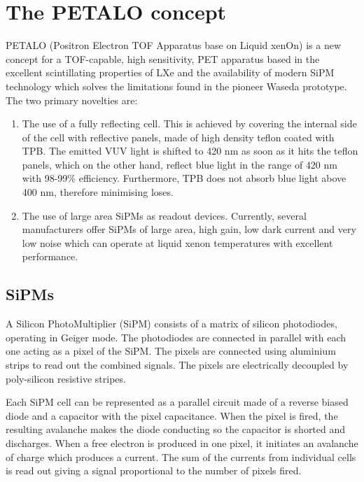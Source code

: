 \documentclass[a4paper,11pt,oneside]{article}
\begin{document}
\section{The PETALO concept}
\label{sec.petalo}

PETALO (Positron Electron TOF Apparatus base on Liquid xenOn) is a new concept for a TOF-capable, high sensitivity, PET apparatus based in the excellent scintillating properties of LXe and the availability of modern SiPM technology which 
solves the limitations found in the pioneer Waseda prototype. The two primary novelties are:
\begin{enumerate}
\item The use of a fully reflecting cell. This is achieved by covering the internal side of the cell with reflective panels, made of high density teflon coated with TPB. The emitted VUV light is shifted to 420 nm as soon as it hits the teflon panels, which on the other hand, reflect blue light in the range of 420 nm with 98-99\% efficiency. Furthermore, TPB does not absorb blue light above 400 nm, therefore minimising loses. 
\item The use of large area SiPMs as readout devices. Currently, several manufacturers offer SiPMs of large area, high gain, low dark current and very low noise which can operate at liquid xenon temperatures with excellent performance.  
\end{enumerate} 

\subsection{SiPMs}

A Silicon PhotoMultiplier (SiPM) consists of a matrix of silicon photodiodes, operating in Geiger mode. The photodiodes are connected in parallel with each one acting as a pixel of the SiPM. The pixels are connected using aluminium strips to read out the combined signals. The pixels are electrically decoupled by poly-silicon resistive stripes.

Each SiPM cell can be represented as a parallel circuit made of a reverse biased diode and a capacitor with the pixel capacitance. When the pixel is fired, the resulting avalanche makes the diode conducting so the capacitor is shorted and discharges.
When a free electron is produced in one pixel, it initiates an avalanche of charge which produces a current. The sum of the currents from individual cells is read out giving a signal proportional to the number of pixels fired.
\end{document}
